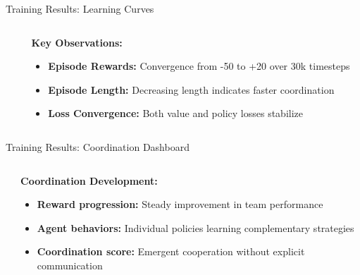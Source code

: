 \documentclass[aspectratio=169]{beamer}
\begin{document}
\begin{frame}{Training Results: Learning Curves}
    \begin{columns}
        \begin{column}{0.5\linewidth}
            \begin{center}
                
            \end{center}
        \end{column}
        \begin{column}{0.5\linewidth}
            \textbf{Key Observations:}
            \begin{itemize}
                \item \textbf{Episode Rewards:} Convergence from -50 to +20 over 30k timesteps
                \item \textbf{Episode Length:} Decreasing length indicates faster coordination
                \item \textbf{Loss Convergence:} Both value and policy losses stabilize
            \end{itemize}    
        \end{column}
    \end{columns}
\end{frame}

\begin{frame}{Training Results: Coordination Dashboard}
    \begin{columns}
        \begin{column}{0.5\linewidth}
            \begin{center}
                
            \end{center}
        \end{column}
        \begin{column}{0.5\linewidth}
            \textbf{Coordination Development:}
            \begin{itemize}
                \item \textbf{Reward progression:} Steady improvement in team performance
                \item \textbf{Agent behaviors:} Individual policies learning complementary strategies
                \item \textbf{Coordination score:} Emergent cooperation without explicit communication
            \end{itemize}
        \end{column}
    \end{columns}
\end{frame}
\end{document}
